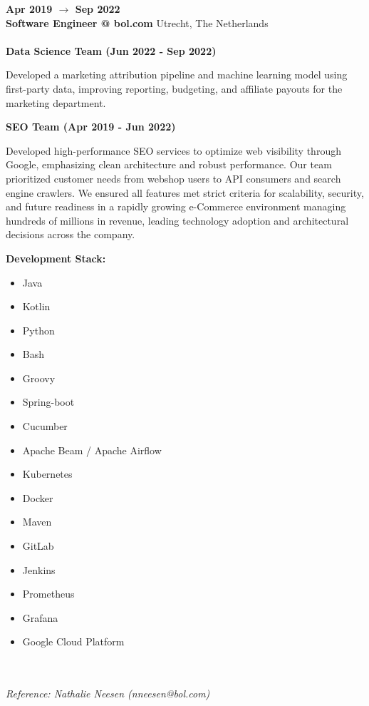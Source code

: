 \documentclass[10pt]{friggeri-cv} %
\renewcommand{\entry}[4]{%
  \textbf{#1} \\
\textbf{#2}%
    \hfill%
    {\footnotesize\addfontfeature{Color=lightgray} #3}\\%
    #4\vspace{0.3\parsep}%
}
\begin{document}
\entry
{Apr 2019 $\rightarrow$ Sep 2022}
{\normalfont Software Engineer @ \textbf{bol.com}}
{Utrecht, The Netherlands}
{\textbf{} \\
\textbf{Data Science Team (Jun 2022 - Sep 2022)}

Developed a marketing attribution pipeline and machine learning model using first-party data, improving reporting, budgeting, and affiliate payouts for the marketing department.

\textbf{SEO Team (Apr 2019 - Jun 2022)}

Developed high-performance SEO services to optimize web visibility through Google, emphasizing clean architecture and robust performance. Our team prioritized customer needs from webshop users to API consumers and search engine crawlers. We ensured all features met strict criteria for scalability, security, and future readiness in a rapidly growing e-Commerce environment managing hundreds of millions in revenue, leading technology adoption and architectural decisions across the company.

\textbf{Development Stack:}\\
\begin{minipage}[t]{0.5\textwidth}
  \begin{itemize}
      \item Java
      \item Kotlin
      \item Python
      \item Bash
      \item Groovy
      \item Spring-boot
      \item Cucumber
      \item Apache Beam / Apache Airflow
  \end{itemize}
\end{minipage}%
%
\begin{minipage}[t]{0.5\textwidth}
  \begin{itemize}
      \item Kubernetes
      \item Docker
      \item Maven
      \item GitLab
      \item Jenkins
      \item Prometheus
      \item Grafana
      \item Google Cloud Platform
  \end{itemize}
\end{minipage}%
}
\\\\
\emph{\small Reference: Nathalie Neesen (nneesen@bol.com)}
\end{document}
